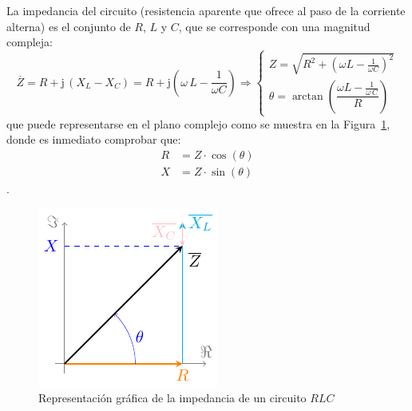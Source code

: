 \documentclass[11pt]{book} %
\numberwithin{dummy}{section}
\theoremstyle{ocrenumbox}
\theoremstyle{blacknumex}
\theoremstyle{blacknumbox}
\theoremstyle{ocrenum}
\newlength\esp
\begin{document}
	La impedancia del circuito (resistencia aparente que ofrece al paso de la corriente alterna) es el conjunto de $R$, $L$ y $C$, que se corresponde con una magnitud compleja: 
	\begin{equation}
		\boxed{ \overline{Z} = R + \mathrm{j}\,(X_L-X_C) = R+ \mathrm{j}\left(\omega\,L-\dfrac{1}{\omega C}\right) \Rightarrow 
			\begin{cases}
				Z=\sqrt{R^2+\left(\omega L -\frac{1}{\omega C} \right)^2}\\
				\theta=\arctan\left(\dfrac{\omega L-\frac{1}{\omega\,C}}{R} \right)
		\end{cases}}
	\end{equation}
	que puede representarse en el plano complejo como se muestra en la Figura~\ref{fig.fasorRLC}, donde es inmediato comprobar que:
	\begin{align*}
		R&=Z\cdot\cos(\theta)\\
		X&=Z\cdot\sin(\theta)
	\end{align*}. 
	\begin{figure}[htbp]
		\centering
		\includegraphics{../figs/fasorRLC.pdf}
		\caption{Representación gráfica de la impedancia de un circuito $RLC$}
		\label{fig.fasorRLC}
	\end{figure}
	
\end{document}
